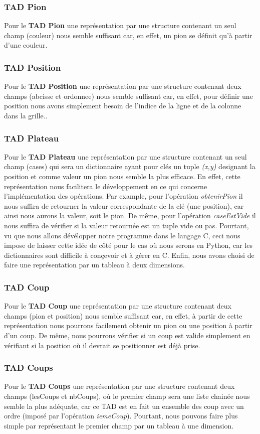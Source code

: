     \subsubsection{TAD Pion}
    Pour le \textbf{TAD Pion} une représentation par une structure contenant un seul champ (couleur) nous semble suffisant car, en effet, un pion se définit qu'à partir d'une couleur.
    \subsubsection{TAD Position}
    Pour le \textbf{TAD Position} une représentation par une structure contenant deux champs (abcisse et ordonnee) nous semble suffisant car, en effet, pour définir une position nous avons simplement besoin de l'indice de la ligne et de la colonne dans la grille..
    \subsubsection{TAD Plateau}
    Pour le \textbf{TAD Plateau} une représentation par une structure contenant un seul champ (cases) qui sera un dictionnaire ayant pour clés un tuple \textit{(x,y)} designant la position et comme valeur un pion nous semble la plus efficace. En effet, cette représentation nous facilitera le développement en ce qui concerne l'implémentation des opérations. Par example, pour l'opération \textit{obtenirPion} il nous suffira de retourner la valeur correspondante de la clé (une position), car ainsi nous aurons la valeur, soit le pion. De même, pour l'opération \textit{caseEstVide} il nous suffira de vérifier si la valeur retournée est un tuple vide ou pas. Pourtant, vu que nous allons dévélopper notre programme dans le langage C, ceci nous impose de laisser cette idée de côté pour le cas où nous serons en Python, car les dictionnaires sont difficile à conçevoir et à gérer en C.
    Enfin, nous avons choisi de faire une représentation par un tableau à deux dimensions.
    \subsubsection{TAD Coup}
    Pour le \textbf{TAD Coup} une représentation par une structure contenant deux champs (pion et position) nous semble suffisant car, en effet, à partir de cette représentation nous pourrons facilement obtenir un pion ou une position à partir d'un coup. De même, nous pourrons vérifier si un coup est valide simplement en vérifiant si la position où il devrait se positionner est déjà prise.
    \subsubsection{TAD Coups }
    Pour le \textbf{TAD Coups} une représentation par une structure contenant deux champs (lesCoups et nbCoups), où le premier champ sera une liste chainée nous semble la plus adéquate, car ce TAD est en fait un ensemble des coup avec un ordre (imposé par l'opération \textit{iemeCoup}). Pourtant, nous pouvons faire plus simple par représentant le premier champ par un tableau à une dimension.
    \newpage
    
